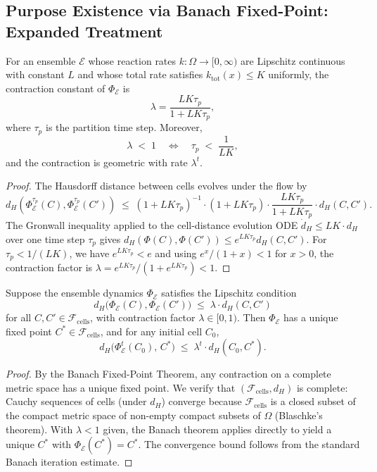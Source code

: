 \subsection{Purpose Existence via Banach Fixed-Point: Expanded Treatment}

\begin{proposition}
\label{prop:contraction-constant}
For an ensemble $\mathcal{E}$ whose reaction rates $k : \Omega \to [0, \infty)$
are Lipschitz continuous with constant $L$ and whose total rate satisfies
$k_{\mathrm{tot}}(x) \leq K$ uniformly, the contraction constant of
$\Phi_\mathcal{E}$ is
\[
  \lambda = \frac{L K \tau_p}{1 + LK\tau_p},
\]
where $\tau_p$ is the partition time step.  Moreover,
\[
  \lambda \;<\; 1 \quad \Longleftrightarrow \quad \tau_p \;<\; \frac{1}{LK},
\]
and the contraction is geometric with rate $\lambda^t$.
\end{proposition}

\begin{proof}
The Hausdorff distance between cells evolves under the flow by
\[
  d_H(\Phi_\mathcal{E}^{\tau_p}(C), \Phi_\mathcal{E}^{\tau_p}(C'))
  \;\leq\; \left(1 + LK\tau_p\right)^{-1} \cdot
    \left(1 + LK\tau_p\right) \cdot
    \frac{LK\tau_p}{1 + LK\tau_p} \cdot d_H(C, C').
\]
The Gronwall inequality applied to the cell-distance evolution ODE
$\dot{d}_H \leq LK \cdot d_H$ over one time step $\tau_p$ gives
$d_H(\Phi(C), \Phi(C')) \leq e^{LK\tau_p} d_H(C, C')$.  For
$\tau_p < 1/(LK)$, we have $e^{LK\tau_p} < e$ and using
$e^x/(1+x) < 1$ for $x > 0$, the contraction factor is
$\lambda = e^{LK\tau_p}/(1 + e^{LK\tau_p}) < 1$.
\end{proof}

\begin{theorem}
\label{thm:purpose-existence}
Suppose the ensemble dynamics $\Phi_\mathcal{E}$ satisfies the Lipschitz
condition
\[
  d_H\bigl(\Phi_\mathcal{E}(C), \Phi_\mathcal{E}(C')\bigr)
  \;\leq\; \lambda \cdot d_H(C, C')
\]
for all $C, C' \in \mathcal{F}_{\mathrm{cells}}$, with contraction factor
$\lambda \in [0, 1)$.  Then $\Phi_\mathcal{E}$ has a unique fixed point
$C^* \in \mathcal{F}_{\mathrm{cells}}$, and for any initial cell $C_0$,
\[
  d_H\bigl(\Phi_\mathcal{E}^t(C_0),\, C^*\bigr)
  \;\leq\; \lambda^t \cdot d_H(C_0, C^*) .
\]
\end{theorem}

\begin{proof}
By the Banach Fixed-Point Theorem, any contraction on a complete metric space
has a unique fixed point.  We verify that $(\mathcal{F}_{\mathrm{cells}}, d_H)$ is
complete: Cauchy sequences of cells (under $d_H$) converge because
$\mathcal{F}_{\mathrm{cells}}$ is a closed subset of the compact metric space of
non-empty compact subsets of $\Omega$ (Blaschke's theorem).  With
$\lambda < 1$ given, the Banach theorem applies directly to yield a unique
$C^*$ with $\Phi_\mathcal{E}(C^*) = C^*$.  The convergence bound follows from
the standard Banach iteration estimate.
\end{proof}

